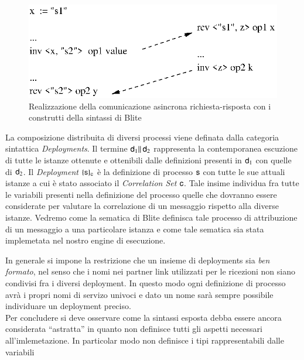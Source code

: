 \begin{figure}[ht]
\begin{center}
  \includegraphics{linguaggio/dia/com}
   \caption[Comunicazione asincrona con Blite]{
   	\textsf{{\small Realizzazione della comunicazione asincrona
   	richiesta-risposta con i construtti della sintassi di Blite}} }
  \label{fig:lin:com}
\end{center}
\end{figure}

La composizione distribuita di diversi processi viene definata dalla categoria
sintattica \emph{Deployments}. Il termine ${\sf d}_1 \|\, {\sf d}_2$ rappresenta la
contemporanea escuzione di tutte le istanze ottenute e ottenibili dalle
definizioni presenti in ${\sf d}_1$ con quelle di ${\sf d}_2$. Il \emph{Deployment}
$\{ {\sf s} \}_{{\sf c}}$ è la definizione di processo ${\sf s}$ con tutte le sue attuali
istanze a cui è stato associato il \emph{Correlation Set} ${\sf c}$. Tale insime
individua fra tutte le variabili presenti nella definizione del processo quelle
che dovranno essere considerate per valutare la correlazione di un messaggio
rispetto alla diverse istanze. Vedremo come la sematica di Blite definisca tale
processo di attribuzione di un messaggio a una particolare istanza e come tale
sematica sia stata implemetata nel nostro engine di esecuzione.
 
In generale si impone la restrizione che un insieme di deployments sia
\emph{ben formato}, nel senso che i nomi nei partner link utilizzati per le
ricezioni non siano condivisi fra i diversi deployment. In questo modo ogni
definizione di processo avrà i propri nomi di servizo univoci e dato un nome
sarà sempre possibile individuare un deployment preciso.
\\

Per concludere si deve osservare come la sintassi esposta debba essere ancora
considerata ``astratta'' in quanto non definisce tutti gli aspetti necessari
all'imlemetazione. In particolar modo non definisce i tipi rappresentabili
dalle variabili

